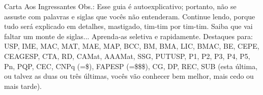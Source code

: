 \begin{secao}{Carta Aos Ingressantes}
Obs.: Esse guia é autoexplicativo; portanto, não se assuste com palavras e
siglas que vocês não entenderam. Continue lendo, porque tudo será explicado em
detalhes, mastigado, tim-tim por tim-tim. Saiba que vai faltar um monte de
siglas...  Aprenda-as seletiva e rapidamente. Destaques para: USP, IME, MAC,
MAT, MAE, MAP, BCC, BM, BMA, LIC, BMAC, BE, CEPE, CEAGESP, CTA, RD, CAMat,
AAAMat, SSG, PUTUSP, P1, P2, P3, P4, P5, Pn, PQP, CEC, CNPq (=\$), FAPESP
(=\$\$\$), CG, DP, REC, SUB (esta última, ou talvez as duas ou três últimas,
vocês vão conhecer bem melhor, mais cedo ou mais tarde).

\end{secao}
